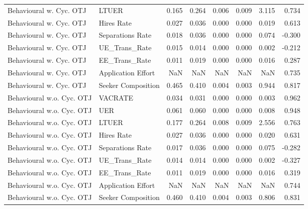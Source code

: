 \begin{tabular}{llrrrrrr}
Behavioural w. Cyc. OTJ & LTUER & 0.165 & 0.264 & 0.006 & 0.009 & 3.115 & 0.734 \\
Behavioural w. Cyc. OTJ & Hires Rate & 0.027 & 0.036 & 0.000 & 0.000 & 0.019 & 0.613 \\
Behavioural w. Cyc. OTJ & Separations Rate & 0.018 & 0.036 & 0.000 & 0.000 & 0.074 & -0.300 \\
Behavioural w. Cyc. OTJ & UE\_Trans\_Rate & 0.015 & 0.014 & 0.000 & 0.000 & 0.002 & -0.212 \\
Behavioural w. Cyc. OTJ & EE\_Trans\_Rate & 0.011 & 0.019 & 0.000 & 0.000 & 0.016 & 0.287 \\
Behavioural w. Cyc. OTJ & Application Effort & NaN & NaN & NaN & NaN & NaN & 0.735 \\
Behavioural w. Cyc. OTJ & Seeker Composition & 0.465 & 0.410 & 0.004 & 0.003 & 0.944 & 0.817 \\
Behavioural w.o. Cyc. OTJ & VACRATE & 0.034 & 0.031 & 0.000 & 0.000 & 0.003 & 0.962 \\
Behavioural w.o. Cyc. OTJ & UER & 0.061 & 0.060 & 0.000 & 0.000 & 0.008 & 0.948 \\
Behavioural w.o. Cyc. OTJ & LTUER & 0.177 & 0.264 & 0.008 & 0.009 & 2.556 & 0.763 \\
Behavioural w.o. Cyc. OTJ & Hires Rate & 0.027 & 0.036 & 0.000 & 0.000 & 0.020 & 0.631 \\
Behavioural w.o. Cyc. OTJ & Separations Rate & 0.017 & 0.036 & 0.000 & 0.000 & 0.075 & -0.282 \\
Behavioural w.o. Cyc. OTJ & UE\_Trans\_Rate & 0.014 & 0.014 & 0.000 & 0.000 & 0.002 & -0.327 \\
Behavioural w.o. Cyc. OTJ & EE\_Trans\_Rate & 0.011 & 0.019 & 0.000 & 0.000 & 0.016 & 0.319 \\
Behavioural w.o. Cyc. OTJ & Application Effort & NaN & NaN & NaN & NaN & NaN & 0.744 \\
Behavioural w.o. Cyc. OTJ & Seeker Composition & 0.460 & 0.410 & 0.004 & 0.003 & 0.806 & 0.831 \\
\bottomrule
\end{tabular}
